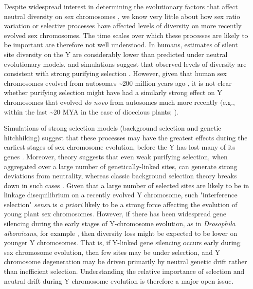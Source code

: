 \documentclass[9pt,twocolumn,twoside,lineno]{gsajnl}
\begin{document}
Despite widespread interest in determining the evolutionary factors that affect neutral diversity on sex chromosomes \citep{ellegren2011,bachtrog2013NRG}, we know very little about how sex ratio variation or selective processes have affected levels of diversity on more recently evolved sex chromosomes. The time scales over which these processes are likely to be important are therefore not well understood. In humans, estimates of silent site diversity on the Y are considerably lower than predicted under neutral evolutionary models, and simulations suggest that observed levels of diversity are consistent with strong purifying selection \citep{Wilsonsayres2014}. However, given that human sex chromosomes evolved from autosomes \textasciitilde 200 million years ago \citep{lahn1999four,ross2005dna}, it is not clear whether purifying selection might have had a similarly strong effect on Y chromosomes that evolved \textit{do novo} from autosomes much more recently (e.g., within the last \textasciitilde 20 MYA in the case of dioecious plants; \citealt{charlesworth2015plant}).

Simulations of strong selection models (background selection and genetic hitchhiking) suggest that these processes may have the greatest effects during the earliest stages of sex chromosome evolution, before the Y has lost many of its genes \citep{bachtrog2008temporal}. Moreover, theory suggests that even weak purifying selection, when aggregated over a large number of genetically-linked sites, can generate strong deviations from neutrality, whereas classic background selection theory breaks down in such cases \citep{mcvean2000, comeron2002population, KaiserCharlesworth, good2014genetic}. Given that a large number of selected sites are likely to be in linkage disequilibrium on a recently evolved Y chromosome, such "interference selection" \textit{sensu} \citealt{good2014genetic} is \textit{a priori} likely to be a strong force affecting the evolution of young plant sex chromosomes. However, if there has been widespread gene silencing during the early stages of Y-chromosome evolution, as in \textit{Drosophila albomicans}, for example \citep{zhou2012chromosome}, then diversity loss might be expected to be lower on younger Y chromosomes. That is, if Y-linked gene silencing occurs early during sex chromosome evolution, then few sites may be under selection, and Y chromosome degeneration may be driven primarily by neutral genetic drift rather than inefficient selection. Understanding the relative importance of selection and neutral drift during Y chromosome evolution is therefore a major open issue.
\end{document}
